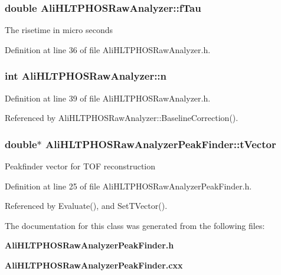 \subsubsection{\setlength{\rightskip}{0pt plus 5cm}double {\bf Ali\-HLTPHOSRaw\-Analyzer::f\-Tau}\hspace{0.3cm}{\tt  [protected, inherited]}}\label{classAliHLTPHOSRawAnalyzer_AliHLTPHOSRawAnalyzerPeakFinderp4}


The risetime in micro seconds 

Definition at line 36 of file Ali\-HLTPHOSRaw\-Analyzer.h.
\subsubsection{\setlength{\rightskip}{0pt plus 5cm}int {\bf Ali\-HLTPHOSRaw\-Analyzer::n}\hspace{0.3cm}{\tt  [protected, inherited]}}\label{classAliHLTPHOSRawAnalyzer_AliHLTPHOSRawAnalyzerPeakFinderp7}




Definition at line 39 of file Ali\-HLTPHOSRaw\-Analyzer.h.

Referenced by Ali\-HLTPHOSRaw\-Analyzer::Baseline\-Correction().
\subsubsection{\setlength{\rightskip}{0pt plus 5cm}double$\ast$ {\bf Ali\-HLTPHOSRaw\-Analyzer\-Peak\-Finder::t\-Vector}\hspace{0.3cm}{\tt  [private]}}\label{classAliHLTPHOSRawAnalyzerPeakFinder_AliHLTPHOSRawAnalyzerPeakFinderr0}


Peakfinder vector for TOF reconstruction 

Definition at line 25 of file Ali\-HLTPHOSRaw\-Analyzer\-Peak\-Finder.h.

Referenced by Evaluate(), and Set\-TVector().

The documentation for this class was generated from the following files:\begin{CompactItemize}
\item 
{\bf Ali\-HLTPHOSRaw\-Analyzer\-Peak\-Finder.h}\item 
{\bf Ali\-HLTPHOSRaw\-Analyzer\-Peak\-Finder.cxx}\end{CompactItemize}
